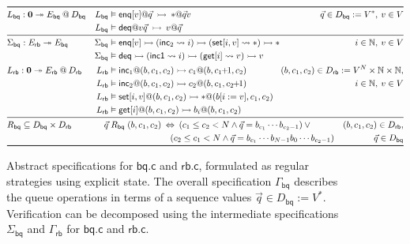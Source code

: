 \documentclass[acmsmall,screen,review,anonymous,nonacm]{acmart}
\newcommand{\kw}[1]{\ensuremath{ \mathsf{#1} }}
\newcommand{\emptysig}{\mathbf0}
\begin{document}
\begin{figure} %
  \small
\begin{align*}
\toprule
&
  L_\kw{bq} : \emptysig \twoheadrightarrow E_\kw{bq} \mathbin@ D_\kw{bq}
&  
  L_\kw{bq} &\vDash
      \kw{enq}[v] @ \vec{q}
      \:\rightarrowtail\:
      {*} @ \vec{q}v
&
  \hspace{-5em}
  \vec{q} \in D_\kw{bq} := V^*, \:
  v \in V
\\ &&
  L_\kw{bq} &\vDash
      \kw{deq} @ v\vec{q}
      \:\rightarrowtail\:
      v @ \vec{q}
\\
\midrule
&
  \Sigma_\kw{bq} : E_\kw{rb} \twoheadrightarrow E_\kw{bq}
&
  \Sigma_\kw{bq} &\vDash
      \kw{enq}[v] \rightarrowtail
      (\kw{inc}_2 \leadsto i) \rightarrowtail
      (\kw{set}[i, v] \leadsto *) \rightarrowtail
      *
&
  i \in \mathbb{N}, \:
  v \in V
\\ &&
    \Sigma_\kw{bq} &\vDash
      \kw{deq} \rightarrowtail
      (\kw{inc1} \leadsto i) \rightarrowtail
      (\kw{get}[i] \leadsto v) \rightarrowtail
      v
\\ &
  L_\kw{rb} : \emptysig \twoheadrightarrow E_\kw{rb} \mathbin@ D_\kw{rb}
&
  L_\kw{rb} &\vDash
    \kw{inc}_1@(b, c_1, c_2) \rightarrowtail
    c_1@(b, c_1\!\!+\!\!1, c_2)
&
  \hspace{-8em}
  (b, c_1, c_2) \in D_\kw{rb} :=
    V^N \times \mathbb{N} \times \mathbb{N},
\\ &&
  L_\kw{rb} &\vDash
    \kw{inc}_2 @(b, c_1, c_2) \rightarrowtail
    c_2@(b, c_1, c_2\!\!+\!\!1)
&
  i \in \mathbb{N}, \:
  v \in V
\\ &&
  L_\kw{rb} &\vDash
    \kw{set}[i, v]@(b, c_1, c_2) \rightarrowtail
    {*}@(b[i := v], c_1, c_2)
\\ &&
  L_\kw{rb} &\vDash
    \kw{get}[i]@(b, c_1, c_2) \rightarrowtail
    b_i@(b, c_1, c_2)
\\ \midrule &
  R_\kw{bq} \subseteq D_\kw{bq} \times D_\kw{rb}
&
        \vec{q} &\mathrel{R_\kw{bq}} (b, c_1, c_2) \: \Leftrightarrow \:
           (c_1 \le c_2 < N \wedge
            \vec{q} = b_{c_1} \cdots b_{c_2-1}) \vee {}
&
  (b, c_1, c_2) \in D_\kw{rb},
\\ &&
         & \hspace{16.3ex}
           (c_2 \le c_1 < N \wedge
            \vec{q} = b_{c_1} \cdots b_{N-1} b_0 \cdots b_{c_2 - 1})
&
  \vec{q} \in D_\kw{bq}
\\
\bottomrule
\end{align*}
\vspace{-2.5em}
  \caption{Abstract specifications for $\kw{bq.c}$ and $\kw{rb.c}$,
    formulated as regular strategies using explicit state.
    The overall specification $\Gamma_\kw{bq}$
    describes the queue operations in terms of
    a sequence values $\vec{q} \in D_\kw{bq} := V^*$.
    Verification can be decomposed using the intermediate specifications
    $\Sigma_\kw{bq}$ and $\Gamma_\kw{rb}$ for
    $\kw{bq.c}$ and $\kw{rb.c}$.}
  \label{fig:spec}
\end{figure}
\end{document}
